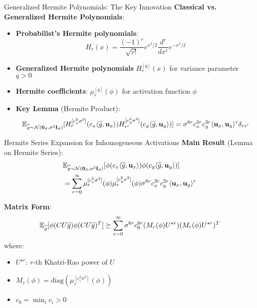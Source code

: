 \begin{frame}{Generalized Hermite Polynomials: The Key Innovation}
  \textbf{Classical vs. Generalized Hermite Polynomials}:
  \begin{itemize}[<+->]
    \item \textbf{Probabilist's Hermite polynomials}:
    $$H_r(x) = \frac{(-1)^r}{\sqrt{r!}} e^{x^2/2} \frac{d^r}{dx^r} e^{-x^2/2}$$
    \item \textbf{Generalized Hermite polynomials} $H_r^{[q]}(x)$ for variance parameter $q > 0$
    \item \textbf{Hermite coefficients}: $\mu_r^{[q]}(\phi)$ for activation function $\phi$
    \item \textbf{Key Lemma} (Hermite Product):
    $$\mathbb{E}_{\widetilde{g} \sim \mathcal{N}(\boldsymbol{0}_d, \sigma^2 \mathbf{I}_d)} [H_r^{[c_x^2 \sigma^2]}(c_x \langle \widetilde{g}, \mathbf{u}_x \rangle) H_{r'}^{[c_y^2 \sigma^2]}(c_y \langle \widetilde{g}, \mathbf{u}_y \rangle)] = \sigma^{6r} c_x^{3r} c_y^{3r} \langle \mathbf{u}_x, \mathbf{u}_y \rangle^r \delta_{rr'}$$
  \end{itemize}
\end{frame}

\begin{frame}{Hermite Series Expansion for Inhomogeneous Activations}
  \textbf{Main Result} (Lemma on Hermite Series):
  \begin{align}
    &\mathbb{E}_{\widetilde{g} \sim \mathcal{N}(\boldsymbol{0}_d, \sigma^2 \mathbf{I}_d)} [\phi(c_x \langle \widetilde{g}, \mathbf{u}_x \rangle) \phi(c_y \langle \widetilde{g}, \mathbf{u}_y \rangle)] \\
    &= \sum_{r=0}^{\infty} \mu_r^{[c_x^2 \sigma^2]}(\phi) \mu_r^{[c_y^2 \sigma^2]}(\phi) \sigma^{6r} c_x^{3r} c_y^{3r} \langle \mathbf{u}_x, \mathbf{u}_y \rangle^r
  \end{align}
  
  \textbf{Matrix Form}:
  $$\mathbb{E}_{\widetilde{g}} [\phi(CU\widetilde{g}) \phi(CU\widetilde{g})^T] \succeq \sum_{r=0}^{\infty} \sigma^{6r} c_0^{6r} (M_r(\phi) U^{\star r})(M_r(\phi) U^{\star r})^T$$
  where:
  \begin{itemize}
    \item $U^{\star r}$: $r$-th Khatri-Rao power of $U$
    \item $M_r(\phi) = \text{diag}(\mu_r^{[c_i^2 \sigma^2]}(\phi))$
    \item $c_0 = \min_{i} c_i > 0$
  \end{itemize}
\end{frame}

